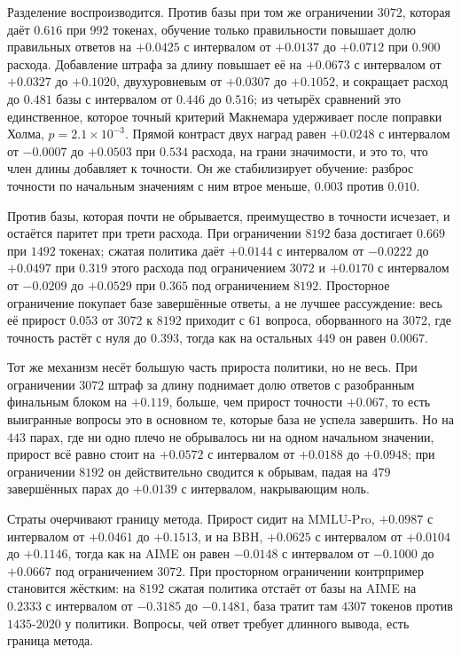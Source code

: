 \documentclass[11pt]{article}
\begin{document}
Разделение воспроизводится. Против базы при том же ограничении $3072$, которая даёт $0.616$ при $992$ токенах, обучение только правильности повышает долю правильных ответов на $+0.0425$ с интервалом от $+0.0137$ до $+0.0712$ при $0.900$ расхода. Добавление штрафа за длину повышает её на $+0.0673$ с интервалом от $+0.0327$ до $+0.1020$, двухуровневым от $+0.0307$ до $+0.1052$, и сокращает расход до $0.481$ базы с интервалом от $0.446$ до $0.516$; из четырёх сравнений это единственное, которое точный критерий Макнемара удерживает после поправки Холма, $p=2.1\times 10^{-3}$. Прямой контраст двух наград равен $+0.0248$ с интервалом от $-0.0007$ до $+0.0503$ при $0.534$ расхода, на грани значимости, и это то, что член длины добавляет к точности. Он же стабилизирует обучение: разброс точности по начальным значениям с ним втрое меньше, $0.003$ против $0.010$.

Против базы, которая почти не обрывается, преимущество в точности исчезает, и остаётся паритет при трети расхода. При ограничении $8192$ база достигает $0.669$ при $1492$ токенах; сжатая политика даёт $+0.0144$ с интервалом от $-0.0222$ до $+0.0497$ при $0.319$ этого расхода под ограничением $3072$ и $+0.0170$ с интервалом от $-0.0209$ до $+0.0529$ при $0.365$ под ограничением $8192$. Просторное ограничение покупает базе завершённые ответы, а не лучшее рассуждение: весь её прирост $0.053$ от $3072$ к $8192$ приходит с $61$ вопроса, оборванного на $3072$, где точность растёт с нуля до $0.393$, тогда как на остальных $449$ он равен $0.0067$.

Тот же механизм несёт большую часть прироста политики, но не весь. При ограничении $3072$ штраф за длину поднимает долю ответов с разобранным финальным блоком на $+0.119$, больше, чем прирост точности $+0.067$, то есть выигранные вопросы это в основном те, которые база не успела завершить. Но на $443$ парах, где ни одно плечо не обрывалось ни на одном начальном значении, прирост всё равно стоит на $+0.0572$ с интервалом от $+0.0188$ до $+0.0948$; при ограничении $8192$ он действительно сводится к обрывам, падая на $479$ завершённых парах до $+0.0139$ с интервалом, накрывающим ноль.

Страты очерчивают границу метода. Прирост сидит на MMLU-Pro, $+0.0987$ с интервалом от $+0.0461$ до $+0.1513$, и на BBH, $+0.0625$ с интервалом от $+0.0104$ до $+0.1146$, тогда как на AIME он равен $-0.0148$ с интервалом от $-0.1000$ до $+0.0667$ под ограничением $3072$. При просторном ограничении контрпример становится жёстким: на $8192$ сжатая политика отстаёт от базы на AIME на $0.2333$ с интервалом от $-0.3185$ до $-0.1481$, база тратит там $4307$ токенов против $1435$-$2020$ у политики. Вопросы, чей ответ требует длинного вывода, есть граница метода.
\end{document}
